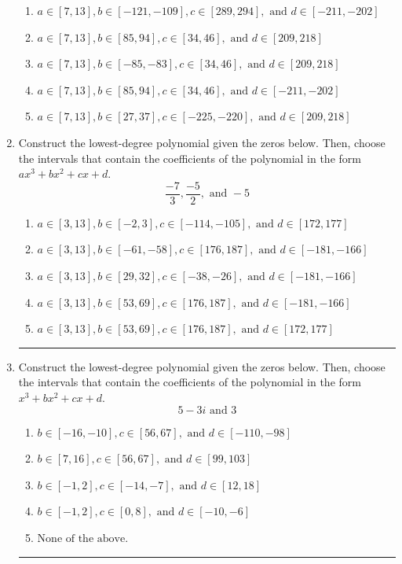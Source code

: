 \documentclass[14pt]{extbook}
\newcommand{\litem}[1]{\item#1\hspace*{-1cm}\rule{\textwidth}{0.4pt}}
\begin{document}
\begin{enumerate}
{\begin{enumerate}[label=\Alph*.]
\item \( a \in [7, 13], b \in [-121, -109], c \in [289, 294], \text{ and } d \in [-211, -202] \)
\item \( a \in [7, 13], b \in [85, 94], c \in [34, 46], \text{ and } d \in [209, 218] \)
\item \( a \in [7, 13], b \in [-85, -83], c \in [34, 46], \text{ and } d \in [209, 218] \)
\item \( a \in [7, 13], b \in [85, 94], c \in [34, 46], \text{ and } d \in [-211, -202] \)
\item \( a \in [7, 13], b \in [27, 37], c \in [-225, -220], \text{ and } d \in [209, 218] \)

\end{enumerate} }
\litem{
Construct the lowest-degree polynomial given the zeros below. Then, choose the intervals that contain the coefficients of the polynomial in the form $ax^3+bx^2+cx+d$.\[ \frac{-7}{3}, \frac{-5}{2}, \text{ and } -5 \]\begin{enumerate}[label=\Alph*.]
\item \( a \in [3, 13], b \in [-2, 3], c \in [-114, -105], \text{ and } d \in [172, 177] \)
\item \( a \in [3, 13], b \in [-61, -58], c \in [176, 187], \text{ and } d \in [-181, -166] \)
\item \( a \in [3, 13], b \in [29, 32], c \in [-38, -26], \text{ and } d \in [-181, -166] \)
\item \( a \in [3, 13], b \in [53, 69], c \in [176, 187], \text{ and } d \in [-181, -166] \)
\item \( a \in [3, 13], b \in [53, 69], c \in [176, 187], \text{ and } d \in [172, 177] \)

\end{enumerate} }
\litem{
Construct the lowest-degree polynomial given the zeros below. Then, choose the intervals that contain the coefficients of the polynomial in the form $x^3+bx^2+cx+d$.\[ 5 - 3 i \text{ and } 3 \]\begin{enumerate}[label=\Alph*.]
\item \( b \in [-16, -10], c \in [56, 67], \text{ and } d \in [-110, -98] \)
\item \( b \in [7, 16], c \in [56, 67], \text{ and } d \in [99, 103] \)
\item \( b \in [-1, 2], c \in [-14, -7], \text{ and } d \in [12, 18] \)
\item \( b \in [-1, 2], c \in [0, 8], \text{ and } d \in [-10, -6] \)
\item \( \text{None of the above.} \)


\end{enumerate}}
\end{enumerate}
\end{document}
